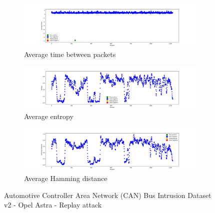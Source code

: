\begin{figure}
    \centering
    \begin{subfigure}[b]{\linewidth}
        \includegraphics[width = \linewidth]{img/parts/app/tests/tue/OpelAstra/replay/AvgTime.png}
        \caption{Average time between packets}
        \label{subfig:extract_tue_opelastra_replay_avgtime}
    \end{subfigure}
    \begin{subfigure}[b]{\linewidth}
        \includegraphics[width = \linewidth]{img/parts/app/tests/tue/OpelAstra/replay/Entropy.png}
        \caption{Average entropy}
        \label{subfig:extract_tue_opelastra_replay_entropy}
    \end{subfigure}
    \begin{subfigure}[b]{\linewidth}
        \includegraphics[width = \linewidth]{img/parts/app/tests/tue/OpelAstra/replay/HammingDist.png}
        \caption{Average Hamming distance}
        \label{subfig:extract_tue_opelastra_replay_hammingdist}
    \end{subfigure}
    \caption{Automotive Controller Area Network (CAN) Bus Intrusion Dataset v2 - Opel Astra - Replay attack}
    \label{fig:extract_tue_opelastra_replay}
\end{figure}

